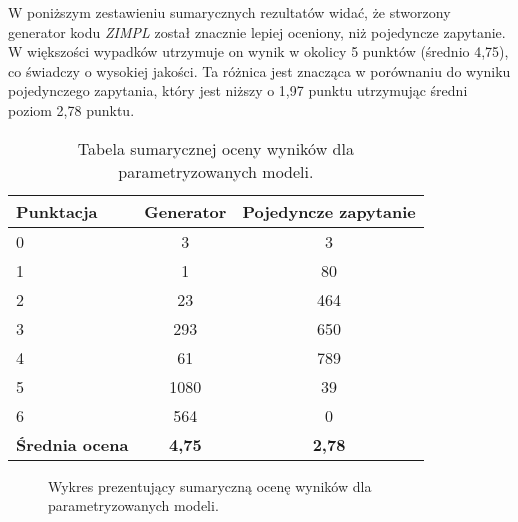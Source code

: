 W poniższym zestawieniu sumarycznych rezultatów widać, że stworzony generator kodu  \textit{ZIMPL} został znacznie lepiej oceniony, niż pojedyncze zapytanie. W większości wypadków utrzymuje on wynik w okolicy 5 punktów (średnio 4,75), co świadczy o wysokiej jakości. Ta różnica jest znacząca w porównaniu do wyniku pojedynczego zapytania, który jest niższy o 1,97 punktu utrzymując średni poziom 2,78 punktu.

\begin{table}[ht]
\caption{Tabela sumarycznej oceny wyników dla parametryzowanych modeli.}\label{tab:tabela23}
\centering%
\begin{tabular}{|l|c|c|}
\hline
\textbf{Punktacja} & \textbf{Generator} & \textbf{Pojedyncze zapytanie}\\
\hline
0 & 3 & 3 \\
\hline
1 & 1 & 80 \\
\hline
2 & 23 & 464 \\
\hline
3 & 293 & 650 \\
\hline
4 & 61 & 789 \\
\hline
5 & 1080 & 39 \\
\hline
6 & 564 & 0 \\
\hline
\textbf{Średnia ocena} & \textbf{4,75} & \textbf{2,78} \\
\hline
\end{tabular}
\end{table}

\begin{figure}[H]
\centering
\begin{minipage}{0.45\textwidth}
\centering
{}
\end{minipage}%
\hspace{0.05\textwidth}
\begin{minipage}{0.45\textwidth}
\centering
{}
\end{minipage}
\caption{Wykres prezentujący sumaryczną ocenę wyników dla parametryzowanych modeli.}
\end{figure}